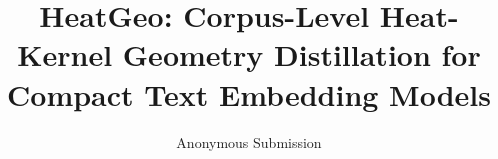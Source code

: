 \documentclass[letterpaper]{article} %
\title{HeatGeo: Corpus-Level Heat-Kernel Geometry Distillation for Compact Text Embedding Models}
\author{Anonymous Submission}
\begin{document}
\maketitle

\begin{abstract}

\end{abstract}










\end{document}
